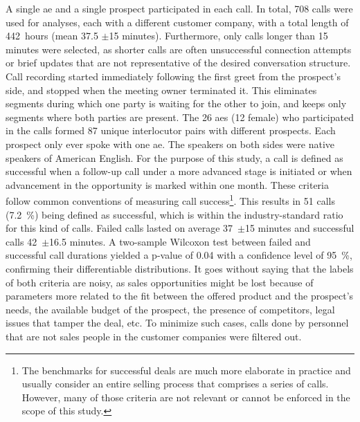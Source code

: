 A single \ac{ae} and a single prospect participated in each call.
In total, 708 calls were used for analyses, each with a different customer company, with a total length of \SI{442}{hours} (mean 37.5 $\pm$15 minutes).
Furthermore, only calls longer than 15 minutes were selected, as shorter calls are often unsuccessful connection attempts or brief updates that are not representative of the desired conversation structure.
Call recording started immediately following the first greet from the prospect's side, and stopped when the meeting owner terminated it.
This eliminates segments during which one party is waiting for the other to join, and keeps only segments where both parties are present.
The 26 \acp{ae} (12 female) who participated in the calls formed 87 unique interlocutor pairs with different prospects.
Each prospect only ever spoke with one \ac{ae}.
The speakers on both sides were native speakers of American English.
For the purpose of this study, a call is defined as successful when a follow-up call under a more advanced stage is initiated or when advancement in the opportunity is marked within one month.
These criteria follow common conventions of measuring call success\footnote{The benchmarks for successful deals are much more elaborate in practice and usually consider an entire selling process that comprises a series of calls.
However, many of those criteria are not relevant or cannot be enforced in the scope of this study.}.
This results in 51 calls (\SI{7.2}{\percent}) being defined as successful, which is within the industry-standard ratio for this kind of calls.
Failed calls lasted on average 37~$\pm$15 minutes and successful calls 42~$\pm$16.5 minutes.
A two-sample Wilcoxon test \citep{Wilcoxon1945individual} between failed and successful call durations yielded a p-value of 0.04 with a confidence level of \SI{95}{\percent}, confirming their differentiable distributions.
It goes without saying that the labels of both criteria are noisy, as sales opportunities might be lost because of parameters more related to the fit between the offered product and the prospect's needs, the available budget of the prospect, the presence of competitors, legal issues that tamper the deal, etc.
To minimize such cases, calls done by personnel that are not sales people in the customer companies were filtered out.

